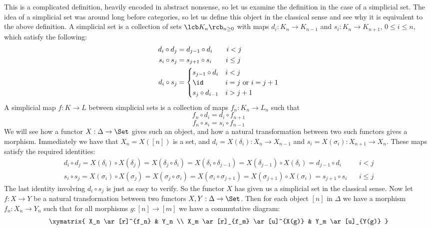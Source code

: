 This is a complicated definition, heavily encoded in abstract nonsense, so let us examine the definition in the case of a simplicial set. The idea of a simplicial set was around long before categories, so let us define this object in the classical sense and see why it is equivalent to the above definition. A simplicial set is a collection of sets $\lcb K_n \rcb_{n \geq 0}$ with maps $d_i : K_n \rightarrow K_{n-1}$ and $s_i : K_n \rightarrow K_{n+1}$, $0 \leq i \leq n$, which satisfy the following:
\begin{align*}
	d_i \circ d_j &= d_{j-1} \circ d_i \ \ \ \ \ \ i < j \\
	s_i \circ s_j &= s_{j+1} \circ s_i \ \ \ \ \ \ i \leq j \\
	d_i \circ s_j &= \begin{cases} s_{j-1} \circ d_i & i < j \\ \id & i=j \text{ or } i=j+1 \\ s_j \circ d_{i-1} & i > j+1 \end{cases}
\end{align*}
A simplicial map $f : K \rightarrow L$ between simplicial sets is a collection of maps $f_n : K_n \rightarrow L_n$ such that
\[ f_n \circ d_i = d_i \circ f_{n+1} \]
\[ f_n \circ s_i = s_i \circ f_{n-1} \]
We will see how a functor $X : \Delta \rightarrow \Set$ gives such an object, and how a natural transformation between two such functors gives a morphism. Immediately we have that $X_n = X([n])$ is a set, and $d_i = X(\delta_i) : X_n \rightarrow X_{n-1}$ and $s_i = X(\sigma_i) : X_{n+1} \rightarrow X_n$. These maps satisfy the required identities:
\begin{align*}
 d_i \circ d_j = X(\delta_i) \circ X(\delta_j) = X(\delta_j \circ \delta_i) = X(\delta_i \circ \delta_{j-1}) = X(\delta_{j-1}) \circ X(\delta_i) = d_{j-1} \circ d_i \ \ \ \ &i<j \\
 s_i \circ s_j = X(\sigma_i) \circ X(\sigma_j) = X(\sigma_j \circ \sigma_i) = X(\sigma_i \circ \sigma_{j+1}) = X(\sigma_{j+1}) \circ X(\sigma_i) = s_{j+1} \circ s_i \ \ \ \ &i \leq j 
\end{align*}
The last identity involving $d_i \circ s_j$ is just as easy to verify. So the functor $X$ has given us a simplicial set in the classical sense. Now let $f : X \rightarrow Y$ be a natural transformation between two functors $X,Y : \Delta \rightarrow \Set$. Then for each object $[n]$ in $\Delta$ we have a morphism $f_n : X_n \rightarrow Y_n$ such that for all morphisms $g : [n] \rightarrow [m]$ we have a commutative diagram:
\[
\xymatrix
{
	X_n \ar[r]^{f_n} & Y_n \\
	X_m \ar[r]_{f_m} \ar[u]^{X(g)} & Y_m \ar[u]_{Y(g)}
}
\]
